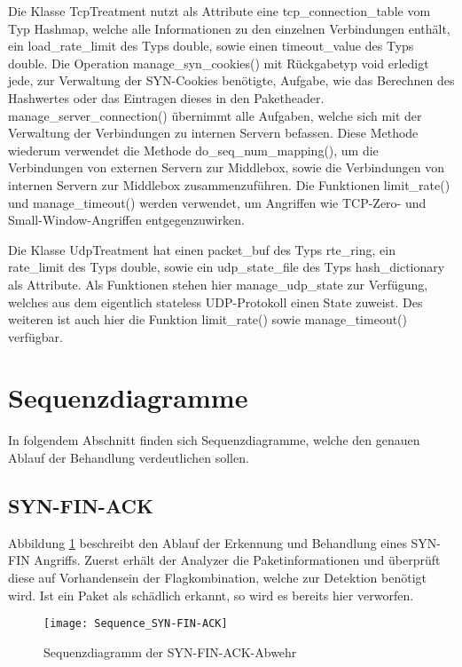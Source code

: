 \documentclass[../review_1.tex]{subfiles}
\begin{document}
Die Klasse TcpTreatment nutzt als Attribute eine tcp\_connection\_table vom Typ Hashmap, welche alle Informationen zu den einzelnen Verbindungen enthält, ein load\_rate\_limit des Typs double, sowie einen timeout\_value des Typs double.
Die Operation manage\_syn\_cookies() mit Rückgabetyp void erledigt jede, zur Verwaltung der SYN-Cookies benötigte, Aufgabe, wie das Berechnen des Hashwertes oder das Eintragen dieses in den Paketheader.
manage\_server\_connection() übernimmt alle Aufgaben, welche sich mit der Verwaltung der Verbindungen zu internen Servern befassen. Diese Methode wiederum verwendet die Methode do\_seq\_num\_mapping(), um die Verbindungen von externen Servern zur Middlebox, sowie die Verbindungen von internen Servern zur Middlebox zusammenzuführen.
Die Funktionen limit\_rate() und manage\_timeout() werden verwendet, um Angriffen wie TCP-Zero- und Small-Window-Angriffen entgegenzuwirken.

Die Klasse UdpTreatment hat einen packet\_buf des Typs rte\_ring, ein rate\_limit des Typs double, sowie ein udp\_state\_file des Typs hash\_dictionary als Attribute.
Als Funktionen stehen hier manage\_udp\_state zur Verfügung, welches aus dem eigentlich stateless UDP-Protokoll einen State zuweist. Des weiteren ist auch hier die Funktion limit\_rate() sowie manage\_timeout() verfügbar.

\section{Sequenzdiagramme}
    In folgendem Abschnitt finden sich Sequenzdiagramme, welche den genauen Ablauf der Behandlung verdeutlichen sollen. 
\subsection{SYN-FIN-ACK}
Abbildung \ref{fig:seqsynfinack} beschreibt den Ablauf der Erkennung und Behandlung eines SYN-FIN Angriffs. Zuerst erhält der Analyzer die Paketinformationen und überprüft diese auf Vorhandensein der Flagkombination, welche zur Detektion benötigt wird. Ist ein Paket als schädlich erkannt, so wird es bereits hier verworfen. 

\begin{figure}[t]
	\centering
	\texttt{[image: Sequence\_SYN-FIN-ACK]}
	\caption{Sequenzdiagramm der SYN-FIN-ACK-Abwehr}
	\label{fig:seqsynfinack}
\end{figure}
\end{document}
